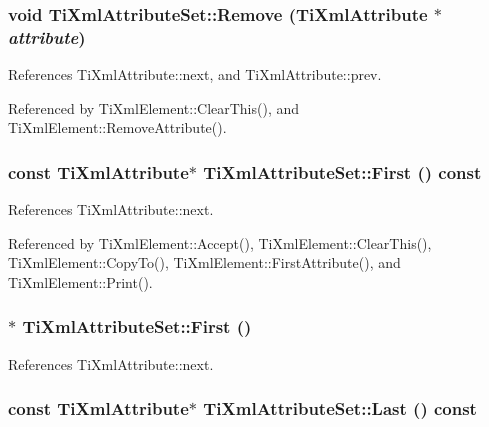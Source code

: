 \subsubsection[Remove]{\setlength{\rightskip}{0pt plus 5cm}void TiXmlAttributeSet::Remove ({\bf TiXmlAttribute} $\ast$ {\em attribute})}\label{classTiXmlAttributeSet_924a73d071f2573f9060f0be57879c57}




References TiXmlAttribute::next, and TiXmlAttribute::prev.

Referenced by TiXmlElement::ClearThis(), and TiXmlElement::RemoveAttribute().
\subsubsection[First]{\setlength{\rightskip}{0pt plus 5cm}const {\bf TiXmlAttribute}$\ast$ TiXmlAttributeSet::First () const\hspace{0.3cm}{\tt  [inline]}}\label{classTiXmlAttributeSet_e0636e88cedd4b09d61c451860f68598}




References TiXmlAttribute::next.

Referenced by TiXmlElement::Accept(), TiXmlElement::ClearThis(), TiXmlElement::CopyTo(), TiXmlElement::FirstAttribute(), and TiXmlElement::Print().
\subsubsection[First]{$\ast$ TiXmlAttributeSet::First ()\hspace{0.3cm}{\tt  [inline]}}\label{classTiXmlAttributeSet_99703bb08ca2aece2d7ef835de339ba0}




References TiXmlAttribute::next.
\subsubsection[Last]{\setlength{\rightskip}{0pt plus 5cm}const {\bf TiXmlAttribute}$\ast$ TiXmlAttributeSet::Last () const\hspace{0.3cm}{\tt  [inline]}}\label{classTiXmlAttributeSet_7b3f3ccf39a97bc25539d3fcc540296a}




